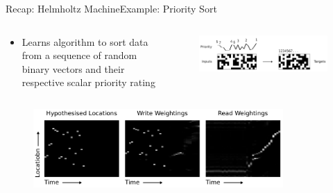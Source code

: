 \documentclass[AERbeamer%
              ,optEnglish%
              ,optBiber%
              ,optBibstyleAlphabetic%
              ,optBeamerClassicFormat%
              ]{AERlatex}%
\begin{document}
\begin{frame}[c]{Recap: Helmholtz Machine}{Example: Priority Sort}
    \centering
    \begin{columns}[T]
        \begin{column}{0.48\textwidth}
            \vspace{0.55cm}
            \begin{itemize}
                \item Learns algorithm to sort data from a sequence of random binary vectors and their
                      respective scalar priority rating
            \end{itemize}
        \end{column}
        \begin{column}{0.48\textwidth}
            \begin{figure}
                \centering
                \includegraphics[width=\textwidth]{NTMPrioritySortIllustration.png}
            \end{figure}
        \end{column}
    \end{columns}
    \begin{figure}
        \centering
        \includegraphics[width=0.85\textwidth]{NTMPrioritySortMemoryAccess.png}
    \end{figure}
\end{frame}
\end{document}
